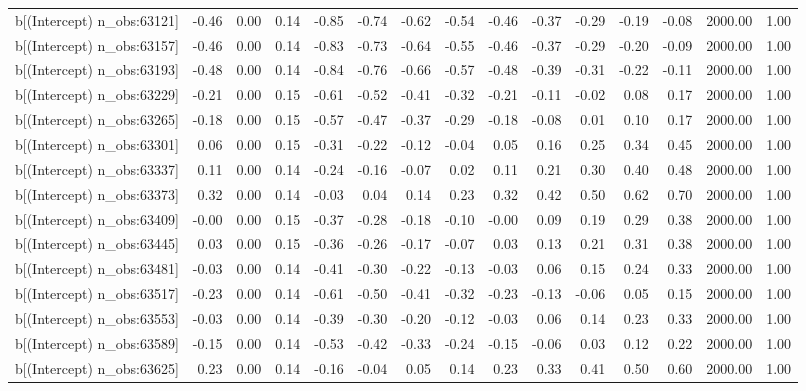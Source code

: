 \begin{table}[ht]
\begin{tabular}{rrrrrrrrrrrrrrr}
  b[(Intercept) n\_obs:63121] & -0.46 & 0.00 & 0.14 & -0.85 & -0.74 & -0.62 & -0.54 & -0.46 & -0.37 & -0.29 & -0.19 & -0.08 & 2000.00 & 1.00 \\ 
  b[(Intercept) n\_obs:63157] & -0.46 & 0.00 & 0.14 & -0.83 & -0.73 & -0.64 & -0.55 & -0.46 & -0.37 & -0.29 & -0.20 & -0.09 & 2000.00 & 1.00 \\ 
  b[(Intercept) n\_obs:63193] & -0.48 & 0.00 & 0.14 & -0.84 & -0.76 & -0.66 & -0.57 & -0.48 & -0.39 & -0.31 & -0.22 & -0.11 & 2000.00 & 1.00 \\ 
  b[(Intercept) n\_obs:63229] & -0.21 & 0.00 & 0.15 & -0.61 & -0.52 & -0.41 & -0.32 & -0.21 & -0.11 & -0.02 & 0.08 & 0.17 & 2000.00 & 1.00 \\ 
  b[(Intercept) n\_obs:63265] & -0.18 & 0.00 & 0.15 & -0.57 & -0.47 & -0.37 & -0.29 & -0.18 & -0.08 & 0.01 & 0.10 & 0.17 & 2000.00 & 1.00 \\ 
  b[(Intercept) n\_obs:63301] & 0.06 & 0.00 & 0.15 & -0.31 & -0.22 & -0.12 & -0.04 & 0.05 & 0.16 & 0.25 & 0.34 & 0.45 & 2000.00 & 1.00 \\ 
  b[(Intercept) n\_obs:63337] & 0.11 & 0.00 & 0.14 & -0.24 & -0.16 & -0.07 & 0.02 & 0.11 & 0.21 & 0.30 & 0.40 & 0.48 & 2000.00 & 1.00 \\ 
  b[(Intercept) n\_obs:63373] & 0.32 & 0.00 & 0.14 & -0.03 & 0.04 & 0.14 & 0.23 & 0.32 & 0.42 & 0.50 & 0.62 & 0.70 & 2000.00 & 1.00 \\ 
  b[(Intercept) n\_obs:63409] & -0.00 & 0.00 & 0.15 & -0.37 & -0.28 & -0.18 & -0.10 & -0.00 & 0.09 & 0.19 & 0.29 & 0.38 & 2000.00 & 1.00 \\ 
  b[(Intercept) n\_obs:63445] & 0.03 & 0.00 & 0.15 & -0.36 & -0.26 & -0.17 & -0.07 & 0.03 & 0.13 & 0.21 & 0.31 & 0.38 & 2000.00 & 1.00 \\ 
  b[(Intercept) n\_obs:63481] & -0.03 & 0.00 & 0.14 & -0.41 & -0.30 & -0.22 & -0.13 & -0.03 & 0.06 & 0.15 & 0.24 & 0.33 & 2000.00 & 1.00 \\ 
  b[(Intercept) n\_obs:63517] & -0.23 & 0.00 & 0.14 & -0.61 & -0.50 & -0.41 & -0.32 & -0.23 & -0.13 & -0.06 & 0.05 & 0.15 & 2000.00 & 1.00 \\ 
  b[(Intercept) n\_obs:63553] & -0.03 & 0.00 & 0.14 & -0.39 & -0.30 & -0.20 & -0.12 & -0.03 & 0.06 & 0.14 & 0.23 & 0.33 & 2000.00 & 1.00 \\ 
  b[(Intercept) n\_obs:63589] & -0.15 & 0.00 & 0.14 & -0.53 & -0.42 & -0.33 & -0.24 & -0.15 & -0.06 & 0.03 & 0.12 & 0.22 & 2000.00 & 1.00 \\ 
  b[(Intercept) n\_obs:63625] & 0.23 & 0.00 & 0.14 & -0.16 & -0.04 & 0.05 & 0.14 & 0.23 & 0.33 & 0.41 & 0.50 & 0.60 & 2000.00 & 1.00 \\ 

\end{tabular}
\end{table}
